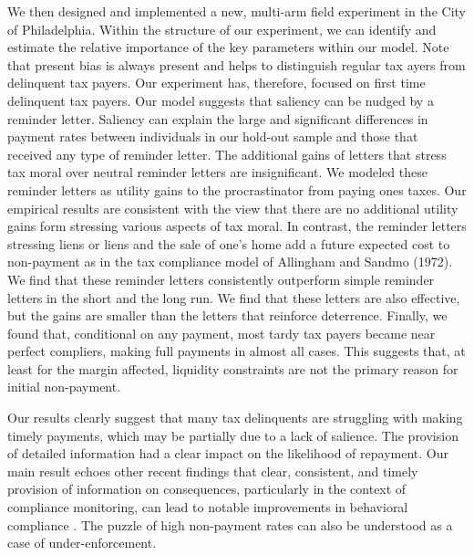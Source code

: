 \documentclass[12pt]{article}
\begin{document}
We then designed and implemented a new, multi-arm field experiment in
the City of Philadelphia.  Within the structure of our experiment, we
can identify and estimate the relative importance of the key
parameters within our model.  Note that present bias is always present
and helps to distinguish regular tax ayers from delinquent tax payers.
Our experiment has, therefore, focused on first time delinquent tax
payers.  Our model suggests that saliency can be nudged by a reminder
letter.  Saliency can explain the large and significant differences in
payment rates between individuals in our hold-out sample and those
that received any type of reminder letter. The additional gains of
letters that stress tax moral over neutral reminder letters are
insignificant. We modeled these reminder letters as utility gains to
the procrastinator from paying ones taxes. Our empirical results are
consistent with the view that there are no additional utility gains
form stressing various aspects of tax moral. In contrast, the reminder
letters stressing liens or liens and the sale of one's home add a
future expected cost to non-payment as in the tax compliance model of
Allingham and Sandmo (1972).  We find that these reminder letters
consistently outperform simple reminder letters in the short and the
long run.  We find that these letters are also effective, but the
gains are smaller than the letters that reinforce deterrence. Finally,
we found that, conditional on any payment, most tardy tax payers
became near perfect compliers, making full payments in almost all
cases. This suggests that, at least for the margin affected, liquidity
constraints are not the primary reason for initial non-payment.

Our results clearly suggest that many tax delinquents are struggling
with making timely payments, which may be partially due to a lack of
salience. The provision of detailed information had a clear impact on
the likelihood of repayment. Our main result echoes other recent
findings that clear, consistent, and timely provision of information
on consequences, particularly in the context of compliance monitoring,
can lead to notable improvements in behavioral compliance
\cite{Bhargava-15}. The puzzle of high non-payment rates can also be
understood as a case of under-enforcement.
\end{document}
